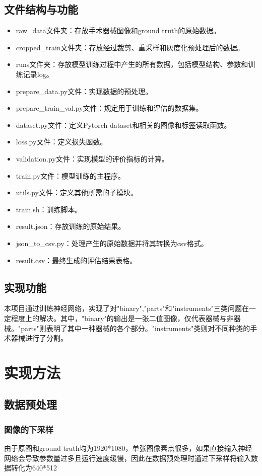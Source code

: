 \documentclass[UTF8]{ctexart}
\begin{document}
\subsection{文件结构与功能}
\begin{itemize}
    \item raw\_data文件夹：存放手术器械图像和ground truth的原始数据。
    \item cropped\_train文件夹：存放经过裁剪、重采样和灰度化预处理后的数据。
    \item runs文件夹：存放模型训练过程中产生的所有数据，包括模型结构、参数和训练记录log。
    \item prepare\_data.py文件：实现数据的预处理。
    \item prepare\_train\_val.py文件：规定用于训练和评估的数据集。
    \item dataset.py文件：定义Pytorch dataset和相关的图像和标签读取函数。
    \item loss.py文件：定义损失函数。
    \item validation.py文件：实现模型的评价指标的计算。
    \item train.py文件：模型训练的主程序。
    \item utils.py文件：定义其他所需的子模块。
    \item train.sh：训练脚本。
    \item result.json：存放训练的原始结果。
    \item json\_to\_csv.py：处理产生的原始数据并将其转换为csv格式。
    \item result.csv：最终生成的评估结果表格。
\end{itemize}
\subsection{实现功能}
本项目通过训练神经网络，实现了对"binary","parts"和"instruments"三类问题在一定程度上的解决。其中，"binary"的输出是一张二值图像，仅代表器械与非器械。"parts"则表明了其中一种器械的各个部分。"instruments"类则对不同种类的手术器械进行了分割。

\section{实现方法}
\subsection{数据预处理}
\subsubsection{图像的下采样}
由于原图和ground truth均为1920*1080，单张图像素点很多，如果直接输入神经网络会导致参数量过多且运行速度缓慢，因此在数据预处理时通过下采样将输入数据转化为640*512
\end{document}
